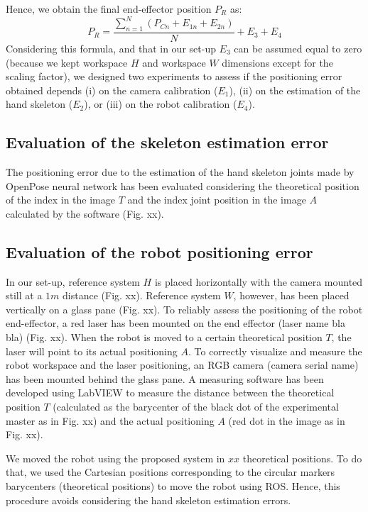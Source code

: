 \documentclass[letterpaper, 10 pt, conference]{ieeeconf}  %
\begin{document}
Hence, we obtain the final end-effector position $P_R$ as: 
\begin{equation}
P_R =\frac{\sum_{n=1}^{N}(P_{Cn} +  E_{1n} +  E_{2n})}{N} + E_3 + E_4
\end{equation}
Considering this formula, and that in our set-up $E_3$ can be assumed equal to zero (because we kept workspace $H$ and workspace $W$ dimensions except for the scaling factor), we designed two experiments to assess if the positioning error obtained depends (i) on the camera calibration ($E_1$), (ii) on the estimation of the hand skeleton ($E_2$), or (iii) on the robot calibration ($E_4$).

\subsection{Evaluation of the skeleton estimation error}
The positioning error due to the estimation of the hand skeleton joints made by OpenPose neural network has been evaluated considering the theoretical position of the index in the image $T$ and the index joint position in the image $A$ calculated by the software (Fig. xx).

\subsection{Evaluation of the robot positioning error}
In our set-up, reference system $H$ is placed horizontally with the camera mounted still at a $1 m$ distance (Fig. xx). Reference system $W$, however, has been placed vertically on a glass pane (Fig. xx).
To reliably assess the positioning of the robot end-effector, a red laser has been mounted on the end effector (laser name bla bla) (Fig. xx). When the robot is moved to a certain theoretical position $T$, the laser will point to its actual positioning $A$. To correctly visualize and measure the robot workspace and the laser positioning, an RGB camera (camera serial name) has been mounted behind the glass pane.
A measuring software has been developed using LabVIEW to measure the distance between the theoretical position $T$ (calculated as the barycenter of the black dot of the experimental master as in Fig. xx) and the actual positioning $A$ (red dot in the image as in Fig. xx).

We moved the robot using the proposed system in $xx$ theoretical positions. To do that, we used the Cartesian positions corresponding to the circular markers barycenters (theoretical positions) to move the robot using ROS. Hence, this procedure avoids considering the hand skeleton estimation errors.
\end{document}
